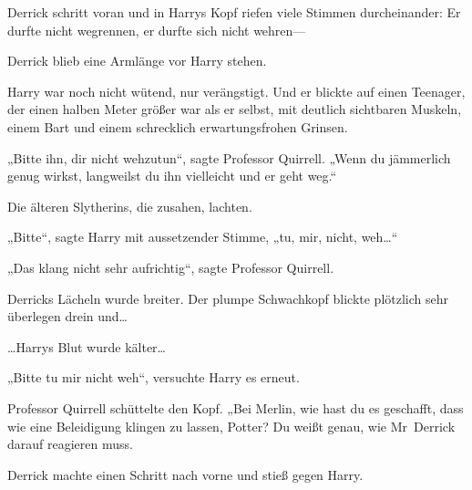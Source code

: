 Derrick schritt voran und in Harrys Kopf riefen viele Stimmen durcheinander: Er durfte nicht wegrennen, er durfte sich nicht wehren—

Derrick blieb eine Armlänge vor Harry stehen.

Harry war noch nicht wütend, nur verängstigt. Und er blickte auf einen Teenager, der einen halben Meter größer war als er selbst, mit deutlich sichtbaren Muskeln, einem Bart und einem schrecklich erwartungsfrohen Grinsen.

„Bitte ihn, dir nicht wehzutun“, sagte Professor Quirrell. „Wenn du jämmerlich genug wirkst, langweilst du ihn vielleicht und er geht weg.“

Die älteren Slytherins, die zusahen, lachten.

„Bitte“, sagte Harry mit aussetzender Stimme, „tu, mir, nicht, weh…“

„Das klang nicht sehr aufrichtig“, sagte Professor Quirrell.

Derricks Lächeln wurde breiter. Der plumpe Schwachkopf blickte plötzlich sehr überlegen drein und…

…Harrys Blut wurde kälter…

„Bitte tu mir nicht weh“, versuchte Harry es erneut.

Professor Quirrell schüttelte den Kopf. „Bei Merlin, wie hast du es geschafft, dass wie eine Beleidigung klingen zu lassen, Potter? Du weißt genau, wie Mr~Derrick darauf reagieren muss.

Derrick machte einen Schritt nach vorne und stieß gegen Harry.

